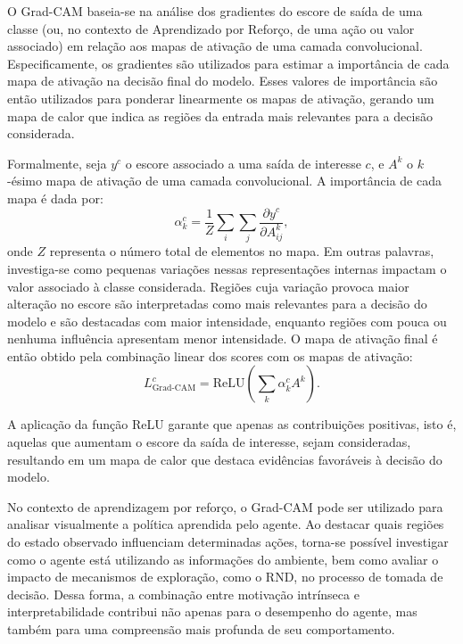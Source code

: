 O Grad-CAM baseia-se na análise dos gradientes do escore de saída de uma classe (ou, no contexto de Aprendizado por Reforço, de uma ação ou valor associado) em relação aos mapas de ativação de uma camada convolucional. Especificamente, os gradientes são utilizados para estimar a importância de cada mapa de ativação na decisão final do modelo. Esses valores de importância são então utilizados para ponderar linearmente os mapas de ativação, gerando um mapa de calor que indica as regiões da entrada mais relevantes para a decisão considerada.

Formalmente, seja $y^c$ o escore associado a uma saída de interesse $c$, e $A^k$ o $k$-ésimo mapa de ativação de uma camada convolucional. A importância de cada mapa é dada por:
$$
\alpha_k^c = \frac{1}{Z} \sum_i \sum_j \frac{\partial y^c}{\partial A_{ij}^k},
$$
onde $Z$ representa o número total de elementos no mapa. Em outras palavras, investiga-se como pequenas variações nessas representações internas impactam o valor associado à classe considerada. Regiões cuja variação provoca maior alteração no escore são interpretadas como mais relevantes para a decisão do modelo e são destacadas com maior intensidade, enquanto regiões com pouca ou nenhuma influência apresentam menor intensidade. O mapa de ativação final é então obtido pela combinação linear dos scores com os mapas de ativação:
$$
L_{\text{Grad-CAM}}^c = \text{ReLU}\left( \sum_k \alpha_k^c A^k \right).
$$

A aplicação da função ReLU garante que apenas as contribuições positivas, isto é, aquelas que aumentam o escore da saída de interesse, sejam consideradas, resultando em um mapa de calor que destaca evidências favoráveis à decisão do modelo.

No contexto de aprendizagem por reforço, o Grad-CAM pode ser utilizado para analisar visualmente a política aprendida pelo agente. Ao destacar quais regiões do estado observado influenciam determinadas ações, torna-se possível investigar como o agente está utilizando as informações do ambiente, bem como avaliar o impacto de mecanismos de exploração, como o RND, no processo de tomada de decisão. Dessa forma, a combinação entre motivação intrínseca e interpretabilidade contribui não apenas para o desempenho do agente, mas também para uma compreensão mais profunda de seu comportamento.